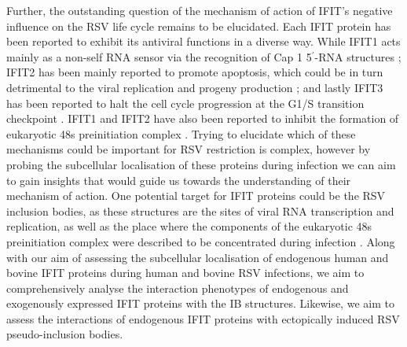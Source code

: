 Further, the outstanding question of the mechanism of action of IFIT's negative influence on the RSV life cycle remains to be elucidated. Each IFIT protein has been reported to exhibit its antiviral functions in a diverse way. While IFIT1 acts mainly as a non-self RNA sensor via the recognition of Cap 1 5$^{\prime}$-RNA structures \cite{Mears2018BetterResponse}; IFIT2 has been mainly reported to promote apoptosis, which could be in turn detrimental to the viral replication and progeny production \cite{Chen2017InhibitionApoptosis}; and lastly IFIT3 has been reported to halt the cell cycle progression at the G1/S transition checkpoint \cite{Xiao2006RIG-GProteins}. IFIT1 and IFIT2 have also been reported to inhibit the formation of eukaryotic 48s preinitiation complex \cite{Diamond2014IFIT1:Translation, Guo2000CharacterizationVirus}. Trying to elucidate which of these mechanisms could be important for RSV restriction is complex, however by probing the subcellular localisation of these proteins during infection we can aim to gain insights that would guide us towards the understanding of their mechanism of action. One potential target for IFIT proteins could be the RSV inclusion bodies, as these structures are the sites of viral RNA transcription and replication, as well as the place where the components of the eukaryotic 48s preinitiation complex were described to be concentrated during infection \cite{Rincheval2017FunctionalVirus, Jobe2020RespiratorySignaling, Jobe2023ViralCondensates}. Along with our aim of assessing the subcellular localisation of endogenous human and bovine IFIT proteins during human and bovine RSV infections, we aim to comprehensively analyse the interaction phenotypes of endogenous and exogenously expressed IFIT proteins with the IB structures. Likewise, we aim to assess the interactions of endogenous IFIT proteins with ectopically induced RSV pseudo-inclusion bodies.


